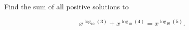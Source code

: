 Find the sum of all positive solutions to

\[
x^{\log_{10}(3)} + x^{\log_{10}(4)} = x^{\log_{10}(5)}.
\]
